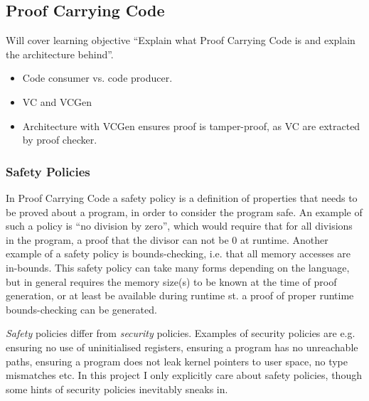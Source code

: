 \subsection{Proof Carrying Code}
\label{subsec:proof_carrying_code}

Will cover learning objective ``Explain what Proof Carrying Code is and explain the architecture behind''.

\begin{itemize}
\item 
Code consumer vs. code producer.
\item VC and VCGen
  \item Architecture with VCGen ensures proof is tamper-proof, as VC are extracted by proof checker.
\end{itemize}




\subsubsection{Safety Policies}
\label{subsec:safety_policies}

In Proof Carrying Code a safety policy is a definition of properties that needs to be proved about a program, in order to consider the program safe. An example of such a policy is ``no division by zero'', which would require that for all divisions in the program, a proof that the divisor can not be 0 at runtime. Another example of a safety policy is bounds-checking, i.e. that all memory accesses are in-bounds. This safety policy can take many forms depending on the language, but in general requires the memory size(s) to be known at the time of proof generation, or at least be available during runtime st. a proof of proper runtime bounds-checking can be generated. 


\textit{Safety} policies differ from \textit{security} policies. Examples of security policies are e.g. ensuring no use of uninitialised registers, ensuring a program has no unreachable paths, ensuring a program does not leak kernel pointers to user space, no type mismatches etc. In this project I only explicitly care about safety policies, though some hints of security policies inevitably sneaks in. 


